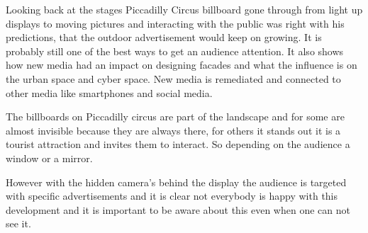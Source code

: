 \documentclass[a4paper, 11pt]{article}
\begin{document}
Looking back at the stages Piccadilly Circus billboard gone through from light up displays to moving pictures and interacting with the public \citep{outdoor2009} was right with his predictions, that the outdoor advertisement would keep on growing. It is probably still one of the best ways to get an audience attention. It also shows how new media had an impact on designing facades and what the influence is on the urban space and cyber space. New media is remediated and connected to other media like smartphones and social media.

The billboards on Piccadilly circus are part of the landscape and for some are almost invisible because they are always there, for others it stands out it is a tourist attraction and invites them to interact. So depending on the audience a window or a mirror.

However with the hidden camera's behind the display the audience is targeted with specific advertisements and it is clear not everybody is happy with this development and it is important to be aware about this even when one can not see it. 






\renewcommand{\textbf}{}
\renewcommand{\bf}{}
{}
\end{document}
